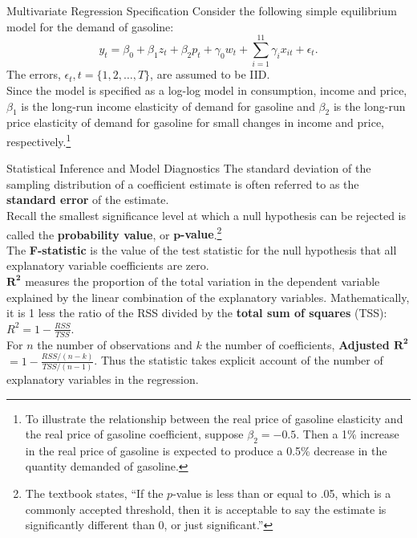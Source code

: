 \documentclass[pdf]{beamer}
\newcommand{\empr}[1]{{\color{franklinblue}\textbf{#1}}}
\theoremstyle{remark}
\theoremstyle{definition}
\begin{document}
\begin{frame}[t]{Multivariate Regression Specification}
Consider the following simple equilibrium model for the demand of gasoline: \\
\vspace{-2.0ex}
    \begin{equation} \label{eqn:1}
    y_t = \beta_0 + \beta_1 z_t + \beta_2 p_t + \gamma_0w_t + \sum_{i=1}^{11}\gamma_i x_{it} + \epsilon_t.
    \end{equation}
 The errors, $\epsilon_t, t = \{1,2,\ldots,T\}$, are assumed to be IID. \\
\vspace{1.5ex}
  Since the model is specified as a log-log model in consumption, income and price, $\beta_1$ is the long-run income elasticity of demand for gasoline and $\beta_2$ is the long-run price elasticity of demand for gasoline for small changes in income and price, respectively.\footnote{To illustrate the relationship between the real price of gasoline elasticity and the real price of gasoline coefficient, suppose $\beta_2 = -0.5$.  Then a 1\% increase in the real price of gasoline is expected to produce a 0.5\% decrease in the quantity demanded of gasoline.}
\end{frame}

\begin{frame}[t]{Statistical Inference and Model Diagnostics}
\small
The standard deviation of the sampling distribution of a coefficient estimate is often referred to as the \empr{standard error} of the estimate. \\
\vspace{1.5ex}
Recall the smallest significance level at which a null hypothesis can be rejected is called the \empr{probability value}, or \empr{$\mathbf{p}$-value}.\footnote{The textbook states, ``If the $p$-value is less than or equal to .05, which is a commonly accepted threshold, then it is acceptable to say the estimate is significantly different than 0, or just significant.''}\\
\vspace{1.5ex}
The \empr{F-statistic} is the value of the test statistic for the null hypothesis that all explanatory variable coefficients are zero.\\
\vspace{1.5ex} 
\empr{$\mathbf{R^2}$} measures the proportion of the total variation in the dependent variable explained by the linear 
combination of the explanatory variables.  Mathematically, it is 1 less the ratio of the RSS divided by the \empr{total sum of squares} (TSS): $R^2 = 1 - \frac{RSS}{TSS}$.  \\
\vspace{1.5ex}
For $n$ the number of observations and $k$ the number of coefficients, \empr{Adjusted $\mathbf{R^2}$} $ = 1- \frac{RSS/(n-k)}{TSS/(n-1)}$.  Thus the statistic takes explicit account of the number of explanatory variables in the regression. 

\end{frame}
\end{document}
